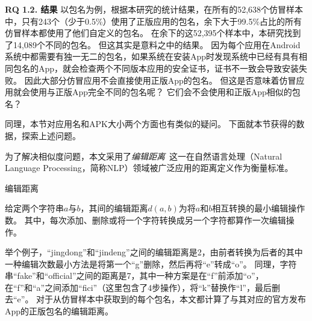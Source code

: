 {\bf RQ 1.2. 结果}
以包名为例，根据本研究的统计结果，在所有的52,638个仿冒样本中，只有243个（少于0.5\%）使用了正版应用的包名，余下大于99.5\%占比的所有仿冒样本都使用了他们自定义的包名。
在余下的这52,395个样本中，本研究找到了14,089个不同的包名。
但这其实是意料之中的结果。
因为每个应用在Android系统中都需要有独一无二的包名，如果系统在安装App时发现系统中已经有具有相同包名的App，就会检查两个不同版本应用的安全证书，证书不一致会导致安装失败。
因此大部分仿冒应用不会直接使用正版App的包名。
但这是否意味着仿冒应用就会使用与正版App完全不同的包名呢？
它们会不会使用和正版App相似的包名？

同理，本节对应用名和APK大小两个方面也有类似的疑问。
下面就本节获得的数据，探索上述问题。

为了解决相似度问题，本文采用了\textit{编辑距离}~\cite{levenshtein1966binary}这一在自然语言处理（Natural Language Processing，简称NLP）领域被广泛应用的距离定义作为衡量标准。

\begin{Def}
	编辑距离

	给定两个字符串$a$与$b$，其间的编辑距离$d(a, b)$为将$a$和$b$相互转换的最小编辑操作数。
	其中，每次添加、删除或将一个字符转换成另一个字符都算作一次编辑操作。
\end{Def}

举个例子，``jingdong''和``jindeng''之间的编辑距离是2，由前者转换为后者的其中一种编辑次数最小方法是将第一个``g''删除，然后再将``e''转成``o''。
同理，字符串``fake''和``official''之间的距离是7，其中一种方案是在``f''前添加``o''，在``f''和``a''之间添加``fici''（这里包含了4步操作），将``k''替换作``l''，最后删去``e''。
对于从仿冒样本中获取到的每个包名，本文都计算了与其对应的官方发布App的正版包名的编辑距离。


